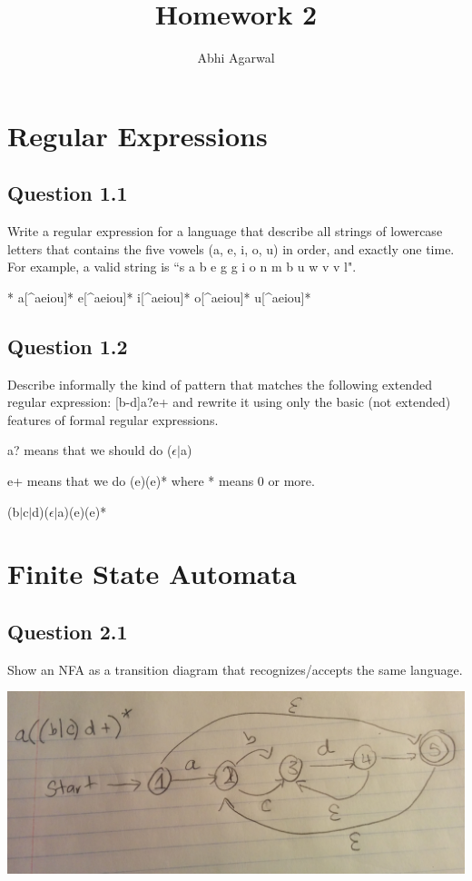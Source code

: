 \documentclass[11pt, oneside]{article}   	%
\title{Homework 2}
\author{Abhi Agarwal}
\date{}
\begin{document}
\maketitle
\section{Regular Expressions}
\subsection{Question 1.1}
\par Write a regular expression for a language that describe all strings of lowercase letters that contains the five vowels (a, e, i, o, u) in order, and exactly one time. For example, a valid string is ``s a b e g g i o n m b u w v v l".
\par [\^{}aeiou]* a[\^{}aeiou]* e[\^{}aeiou]* i[\^{}aeiou]* o[\^{}aeiou]* u[\^{}aeiou]*

\subsection{Question 1.2}
\par Describe informally the kind of pattern that matches the following extended regular expression: [b-d]a?e+ and rewrite it using only the basic (not extended) features of formal regular expressions.
\par a? means that we should do ($\epsilon|$a)
\par e+ means that we do (e)(e)* where * means 0 or more.
\par (b$|$c$|$d)($\epsilon|$a)(e)(e)*

\section{Finite State Automata}
\subsection{Question 2.1}
\par Show an NFA as a transition diagram that recognizes/accepts the same language.
\par \includegraphics[scale=0.125]{hw21.png}
\end{document}
